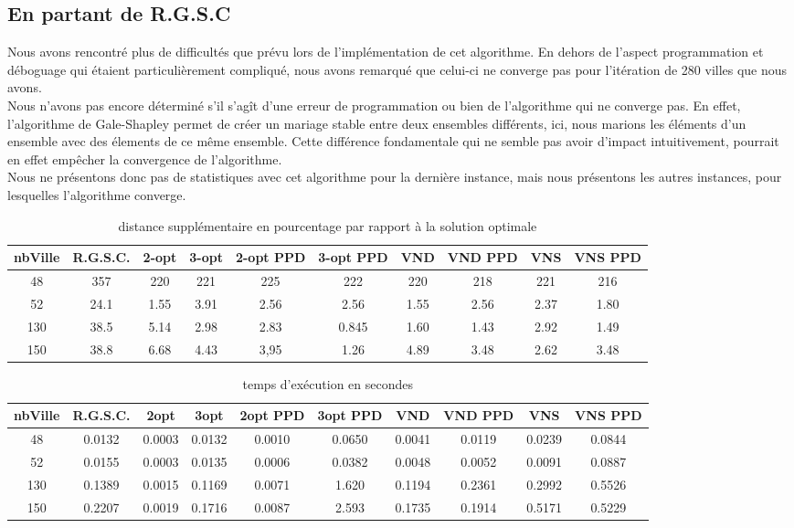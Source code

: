 \documentclass[12pt,a4paper]{article}
\begin{document}
\subsection{En partant de R.G.S.C}
Nous avons rencontré plus de difficultés que prévu lors de l'implémentation de cet algorithme. En dehors de l'aspect programmation et déboguage qui étaient particulièrement compliqué, nous avons remarqué que celui-ci ne converge pas pour l'itération de 280 villes que nous avons.\\
Nous n'avons pas encore déterminé s'il s'agît d'une erreur de programmation ou bien de l'algorithme qui ne converge pas. En effet, l'algorithme de Gale-Shapley permet de créer un mariage stable entre deux ensembles différents, ici, nous marions les éléments d'un ensemble avec des élements de ce même ensemble. Cette différence fondamentale qui ne semble pas avoir d'impact intuitivement, pourrait en effet empêcher la convergence de l'algorithme.\\
Nous ne présentons donc pas de statistiques avec cet algorithme pour la dernière instance, mais nous présentons les autres instances, pour lesquelles l'algorithme converge.\\
\begin{table}[!h]
\leftskip -1.2cm
{
\begin{tabular}{|*{10}{c|}}
  \hline
  nbVille & R.G.S.C. & 2-opt & 3-opt & 2-opt PPD & 3-opt PPD & VND & VND PPD & VNS & VNS PPD \\
  \hline
  48 & 357 & 220 & 221 & 225 & 222 & 220 & 218 & 221 & 216 \\
  52 & 24.1 & 1.55 & 3.91 & 2.56 & 2.56 & 1.55 & 2.56 & 2.37 & 1.80 \\
  130 & 38.5 & 5.14 & 2.98 & 2.83 & 0.845 & 1.60 & 1.43 & 2.92 & 1.49 \\
  150 & 38.8 & 6.68 & 4.43 & 3,95 & 1.26 & 4.89 & 3.48 & 2.62 & 3.48 \\
  \hline
\end{tabular}
}
\caption{distance supplémentaire en pourcentage par rapport à la solution optimale}
\label{RGSCpourcentageperf}
\end{table}

\begin{table}[!h]
\leftskip -1.6cm
{
\begin{tabular}{|*{10}{c|}}
  \hline
  nbVille & R.G.S.C. & 2opt & 3opt & 2opt PPD & 3opt PPD & VND & VND PPD & VNS & VNS PPD \\
  \hline
  48 & 0.0132 & 0.0003 & 0.0132 & 0.0010 & 0.0650 & 0.0041 & 0.0119 & 0.0239 & 0.0844 \\
  52 & 0.0155 & 0.0003 & 0.0135 & 0.0006 & 0.0382 & 0.0048 & 0.0052 & 0.0091 & 0.0887 \\
  130 & 0.1389 & 0.0015 & 0.1169 & 0.0071 & 1.620 & 0.1194 & 0.2361 & 0.2992 & 0.5526 \\
  150 & 0.2207 & 0.0019 & 0.1716 & 0.0087 & 2.593 & 0.1735 & 0.1914 & 0.5171 & 0.5229 \\
  \hline
\end{tabular}
}
\caption{temps d’exécution en secondes}
\label{RGSCtemps}
\end{table}
\end{document}
